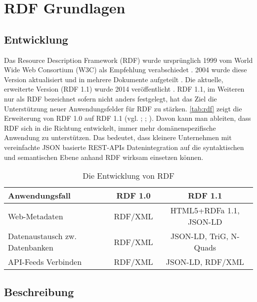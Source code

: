 \section{RDF Grundlagen}
\subsection{Entwicklung}
\label{sec:entwicklung}

Das Resource Description Framework (RDF) wurde ursprünglich 1999 vom World Wide Web Consortium (W3C) als Empfehlung verabschiedet \parencite{Lassila:99:RMS}. 2004 wurde diese Version aktualisiert und in mehrere Dokumente aufgeteilt \parencite{Beckett:04:RSS}. Die aktuelle, erweiterte Version (RDF 1.1) wurde 2014 veröffentlicht \parencite{Schreiber:14:RP}. RDF 1.1, im Weiteren nur als RDF bezeichnet sofern nicht anders festgelegt, hat das Ziel die Unterstützung neuer Anwendungsfelder für RDF zu stärken. \autoref{tab:rdf} zeigt die Erweiterung von RDF 1.0 auf RDF 1.1 (vgl. \cite[Abs.~2]{Klyne:04:RDF}; \cite[Abs.~2]{Schreiber:14:RP}; \cite{Wood:14:WNR}). Davon kann man ableiten, dass RDF sich in die Richtung entwickelt, immer mehr domänenspezifische Anwendung zu unterstützen. Das bedeutet, dass kleinere Unternehmen mit vereinfachte JSON basierte REST-APIs Datenintegration\footnotemark{} auf die syntaktischen und semantischen Ebene anhand RDF wirksam einsetzen können.

\begin{table}[h]
	\centering
	\begin{tabular}{|p{9em}|c|c|}
		\hline \rule[-2ex]{0pt}{5.5ex} Anwendungsfall & RDF 1.0 & RDF 1.1 \\ 
		\hline \rule[-2ex]{0pt}{5.5ex} Web-Metadaten & RDF/XML & HTML5+RDFa 1.1, JSON-LD\\ 
		\hline \rule[-2ex]{0pt}{5.5ex} Datenaustausch zw. Datenbanken\footnotemark{}& RDF/XML & JSON-LD, TriG, N-Quads  \\
		\hline \rule[-2ex]{0pt}{5.5ex} API-Feeds Verbinden \footnotemark[\value{footnote}] & RDF/XML& JSON-LD, RDF/XML\\ 
		\hline
	\end{tabular}
	\caption{Die Entwicklung von RDF}
	\label{tab:rdf}
\end{table}

\subsection{Beschreibung} 

